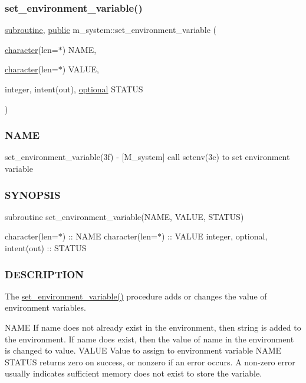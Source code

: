 \subsubsection{\texorpdfstring{set\+\_\+environment\+\_\+variable()}{set\_environment\_variable()}}
{\footnotesize\ttfamily \hyperlink{M__stopwatch_83_8txt_acfbcff50169d691ff02d4a123ed70482}{subroutine}, \hyperlink{M__stopwatch_83_8txt_a2f74811300c361e53b430611a7d1769f}{public} m\+\_\+system\+::set\+\_\+environment\+\_\+variable (\begin{DoxyParamCaption}\item[{\hyperlink{option__stopwatch_83_8txt_abd4b21fbbd175834027b5224bfe97e66}{character}(len=$\ast$)}]{N\+A\+ME,  }\item[{\hyperlink{option__stopwatch_83_8txt_abd4b21fbbd175834027b5224bfe97e66}{character}(len=$\ast$)}]{V\+A\+L\+UE,  }\item[{integer, intent(out), \hyperlink{option__stopwatch_83_8txt_aa4ece75e7acf58a4843f70fe18c3ade5}{optional}}]{S\+T\+A\+T\+US }\end{DoxyParamCaption})}



\subsubsection*{N\+A\+ME}

set\+\_\+environment\+\_\+variable(3f) -\/ \mbox{[}M\+\_\+system\mbox{]} call setenv(3c) to set environment variable \subsubsection*{S\+Y\+N\+O\+P\+S\+IS}

subroutine set\+\_\+environment\+\_\+variable(\+N\+A\+M\+E, V\+A\+L\+U\+E, S\+T\+A\+T\+U\+S)

character(len=$\ast$) \+:\+: N\+A\+ME character(len=$\ast$) \+:\+: V\+A\+L\+UE integer, optional, intent(out) \+:\+: S\+T\+A\+T\+US \subsubsection*{D\+E\+S\+C\+R\+I\+P\+T\+I\+ON}

The \hyperlink{namespacem__system_ad813765403a5d9d6fb7a2edcb669fe4b}{set\+\_\+environment\+\_\+variable()} procedure adds or changes the value of environment variables.

N\+A\+ME If name does not already exist in the environment, then string is added to the environment. If name does exist, then the value of name in the environment is changed to value. V\+A\+L\+UE Value to assign to environment variable N\+A\+ME S\+T\+A\+T\+US returns zero on success, or nonzero if an error occurs. A non-\/zero error usually indicates sufficient memory does not exist to store the variable.

